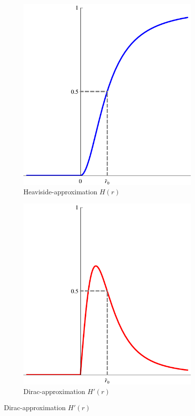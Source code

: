 \documentclass[12pt,a4paper]{report}
\numberwithin{equation}{chapter}
\begin{document}
\begin{figure}
\begin{subfigure}{0.45\textwidth}
\caption{Heaviside-approximation $H(r)$}\label{fig:diracH-holo}
\includegraphics[width=\textwidth]{figures/diracH-holo.pdf}
\end{subfigure}%
\hspace{0.02\textwidth}
\begin{subfigure}{0.45\textwidth}
\caption{Dirac-approximation $H'(r)$}\label{fig:diracH-dholo}
\includegraphics[width=\textwidth]{figures/diracH-dholo.pdf}

\end{subfigure}
\end{figure}
\end{document}
